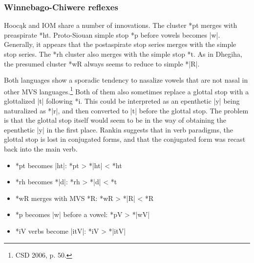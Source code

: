\documentclass[output=paper]{LSP/langsci}
\begin{document}
\subsubsection{Winnebago-Chiwere reflexes}

Hooc\k{a}k and IOM share a number of innovations.  The cluster *pt merges with preaspirate *ht.  Proto-Siouan simple stop *p before vowels becomes |w|.  Generally, it appears that the postaspirate stop series merges with the simple stop series.  The *rh cluster also merges with the simple stop *t.  As in Dhegiha, the presumed cluster *wR always seems to reduce to simple *|R|.  

Both languages show a sporadic tendency to nasalize vowels that are not nasal in other MVS languages.\footnote{CSD 2006, p. 50.} Both of them also sometimes replace a glottal stop with a glottalized |t\textsuperscript{}| following *i.  This could be interpreted as an epenthetic |y| being naturalized as *|r|, and then converted to |t| before the glottal stop.  The problem is that the glottal stop itself would seem to be in the way of obtaining the epenthetic |y| in the first place.  Rankin suggests that in verb paradigms, the glottal stop is lost in conjugated forms, and that the conjugated form was recast back into the main verb.

\begin{itemize}
\item *pt becomes |ht|: \hspace{7em} *pt	>	*|ht|	<	*ht
\item *rh becomes *|d|: \hspace{7em} *rh	>	*|d|	<	*t
\item *wR merges with MVS *R: \hspace{3em} *wR	>	*|R|	<	*R
\item *p becomes |w| before a vowel: \hspace{1em} *pV	>	*|wV|
\item *i\textsuperscript{}V verbs become |it\textsuperscript{}V|:	\hspace{4em} *i\textsuperscript{}V	>	*|it\textsuperscript{}V|
\end{itemize}
 
\end{document}
